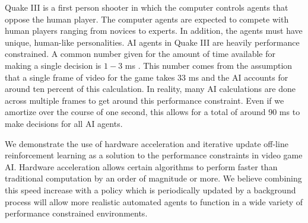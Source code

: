 Quake III is a first person shooter in which the computer controls agents that oppose the human player. The computer agents are expected to compete with human players ranging from novices to experts. In addition, the agents must have unique, human-like personalities. AI agents in Quake III are heavily performance constrained. A common number given for the amount of time available for making a single decision is $1-3$ ms \cite{game:ai:lecture}. This number comes from the assumption that a single frame of video for the game takes $33$ ms and the AI accounts for around ten percent of this calculation. In reality, many AI calculations are done across multiple frames to get around this performance constraint. Even if we amortize over the course of one second, this allows for a total of around 90 ms to make decisions for all AI agents.

We demonstrate the use of hardware acceleration and iterative update off-line reinforcement learning as a solution to the performance constraints in video game AI. Hardware acceleration allows certain algorithms to perform faster than traditional computation by an order of magnitude or more. We believe combining this speed increase with a policy which is periodically updated by a background process will allow more realistic automated agents to function in a wide variety of performance constrained environments.